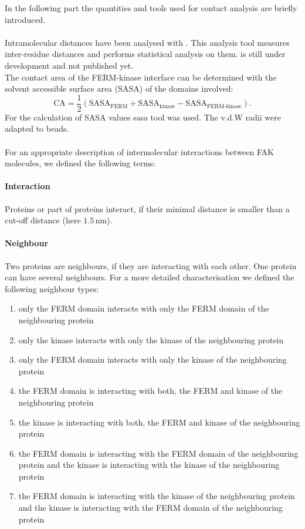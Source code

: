In the following part the quantities and tools used for contact analysis are briefly introduced.\\
\\
Intramolecular distances have been analysed with \conan{}. This analysis tool measures inter-residue distances and performs statistical analysis on them. \conan{} is still under development and not published yet.\\%
The contact area of the FERM-kinase interface can be determined with the solvent accessible surface area (SASA) of the domains involved:
\begin{equation}
\text{CA} = \frac{1}{2} \left(\text{SASA}_\text{FERM} + \text{SASA}_\text{kinase} - \text{SASA}_\text{FERM-kinase}\right).
\end{equation}
For the calculation of SASA values \gromacs{} sasa tool was used. The v.d.W radii were adapted to \martini{} beads.\\
\\
For an appropriate description of intermolecular interactions between FAK molecules, we defined the following terms:
\paragraph{Interaction} Proteins or part of proteins interact, if their minimal distance is smaller than a cut-off distance (here $1.5\,\si{\nano\metre}$).
\paragraph{Neighbour} Two proteins are neighbours, if they are interacting with each other. One protein can have several neighbours. For a more detailed characterisation we defined the following neighbour types:
\begin{enumerate}[label={type \theenumi:}, leftmargin=*]
	\setcounter{enumi}{0}
	\item only the FERM domain interacts with only the FERM domain of the neighbouring protein
	\item only the kinase interacts with only the kinase of the neighbouring protein
	\item only the FERM domain interacts with only the kinase of the neighbouring protein
	\item the FERM domain is interacting with both, the FERM and kinase of the neighbouring protein
	\item the kinase is interacting with both, the FERM and kinase of the neighbouring protein
	\item the FERM domain is interacting with the FERM domain of the neighbouring protein and the kinase is interacting with the kinase of the neighbouring protein
	\item the FERM domain is interacting with the kinase of the neighbouring protein and the kinase is interacting with the FERM domain of the neighbouring protein
\end{enumerate}
